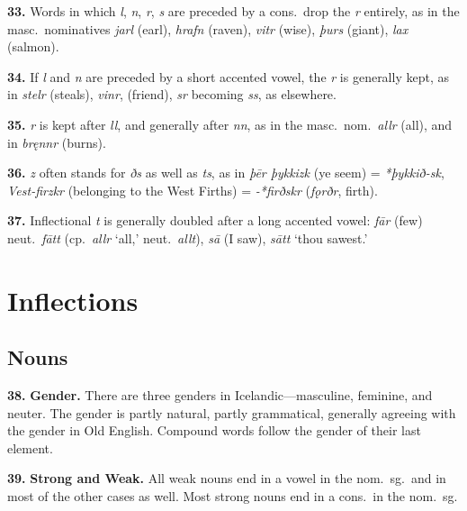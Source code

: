 \documentclass[12pt,letterpaper]{book}
\newcommand\emptypage{\clearpage{\pagestyle{empty}\cleardoublepage}}
\begin{document}
\textbf{33.} Words in which \textit{l}, \textit{n}, \textit{r}, \textit{s} are preceded
by a cons.\ drop the \textit{r} entirely, as in the masc.\ nominatives
\textit{jarl} (earl), \textit{hrafn} (raven), \textit{vitr} (wise), \textit{þurs}
(giant), \textit{lax} (salmon).

\textbf{34.} If \textit{l} and \textit{n} are preceded by a short accented vowel,
the \textit{r} is generally kept, as in \textit{stelr} (steals),
\textit{vinr}, (friend), \textit{sr} becoming \textit{ss}, as elsewhere.

\textbf{35.} \textit{r} is kept after \textit{ll}, and generally after \textit{nn},
as in the masc.\ nom.\ \textit{allr} (all), and in \textit{bręnnr} (burns).

\textbf{36.} \textit{z} often stands for \textit{ðs} as well as \textit{ts}, as in
\textit{þēr þykkizk} (ye seem) = \textit{*þykkið-sk}, \textit{Vest-firzkr}
(belonging to the West Firths) = \textit{-*firðskr} (\textit{fǫrðr},
firth).

\textbf{37.} Inflectional \textit{t} is generally doubled after a long accented
vowel: \textit{fār} (few) neut.\ \textit{fātt} (cp.\ \textit{allr} `all,'
neut.\ \textit{allt}), \textit{sā} (I saw), \textit{sātt} `thou sawest.'

\emptypage

\chapter{Inflections}

\section{Nouns}

\textbf{38.} \textbf{Gender.}  There are three genders in Icelandic---masculine,
feminine, and neuter.  The gender is partly natural, partly
grammatical, generally agreeing with the gender in Old English.
Compound words follow the gender of their last element.

\textbf{39.} \textbf{Strong and Weak.}  All weak nouns end in a vowel in the
nom.\ sg.\ and in most of the other cases as well.  Most strong nouns
end in a cons.\ in the nom.\ sg.
\end{document}
